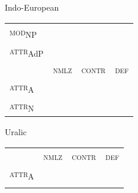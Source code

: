 {%

\begin{figure}
\parbox[b]{0.5\textwidth}{
\begin{center}Indo-European\\
\medskip
\begin{tabular}{| m{1.4cm} || m{.9cm} | m{1.1cm} | m{.7cm} |}
\cline{1-1}
\textsc{mod}\textsubscript{NP}\\
\cline{1-1}
\textsc{attr}\textsubscript{AdP}\\
\hline
 & \textsc{nmlz} & \textsc{contr} & \textsc{def}\\
\hline
\textsc{attr}\textsubscript{A}\\
\cline{1-1}
\textsc{attr}\textsubscript{N}\\
\cline{1-1}
\end{tabular}
\end{center}
}
\parbox[b]{0.5\textwidth}{
\begin{center}Uralic\\
\medskip
\begin{tabular}{| m{1.4cm} || m{.9cm} | m{1.1cm} | m{.7cm} |}
\cline{1-1}
\\
\cline{1-1}
\\
\hline
 & \textsc{nmlz} & \textsc{contr} & \textsc{def}\\
\hline
\textsc{attr}\textsubscript{A}\\
\cline{1-1}
\\
\cline{1-1}
\end{tabular}
\end{center}
}


\end{figure}}
